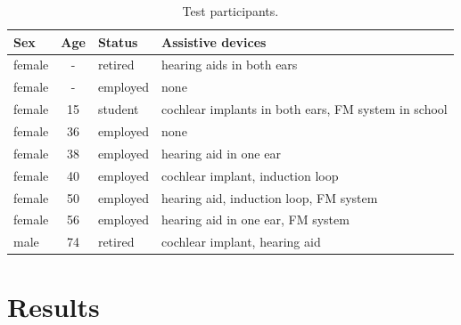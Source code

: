 \documentclass[english, 12pt, a4paper, pdftex, elec, utf8]{aaltothesis}
\begin{document}
\begin{table}[]
    \renewcommand{\arraystretch}{1.2}  %
    \setlength{\tabcolsep}{9pt}                %
    \centering
    \caption{Test participants.}
    \label{table:testsubjects}
    \begin{tabular}{@{}lcll@{}}
        \toprule
        \textbf{Sex} & \textbf{Age} & \textbf{Status} & \textbf{Assistive devices}                          \\ \midrule
        female       & -            & retired         & hearing aids in both ears                           \\ \midrule
        female       & -            & employed        & none                                                \\ \midrule
        female       & 15           & student         & cochlear implants in both ears, FM system in school \\ \midrule
        female       & 36           & employed        & none                                                \\ \midrule
        female       & 38           & employed        & hearing aid in one ear                              \\ \midrule
        female       & 40           & employed        & cochlear implant, induction loop                    \\ \midrule
        female       & 50           & employed        & hearing aid, induction loop, FM system              \\ \midrule
        female       & 56           & employed        & hearing aid in one ear, FM system                   \\ \midrule
        male         & 74           & retired         & cochlear implant, hearing aid                       \\ \bottomrule
    \end{tabular}
\end{table}

\clearpage

\section{Results} \label{sec:results}
\end{document}
